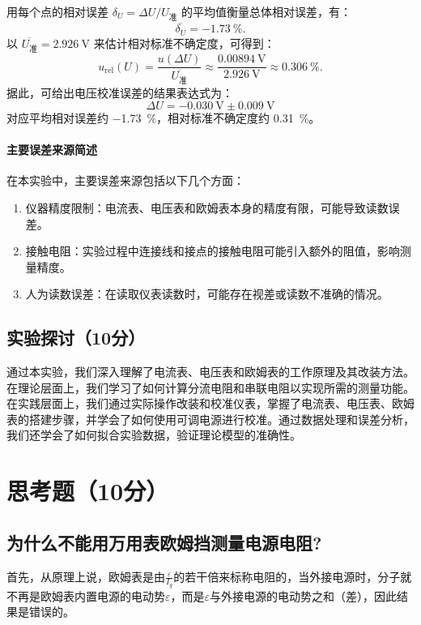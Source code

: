 \documentclass[]{../../templates/Report}%
\begin{document}
\begin{fullreportonly}
    用每个点的相对误差 $\delta_U=\Delta U/U_\text{准}$ 的平均值衡量总体相对误差，有：
    \begin{equation}
        \overline{\delta_U}=\SI{-1.73}{\percent}.
    \end{equation}
    以 $\overline{U_\text{准}}=\SI{2.926}{\volt}$ 来估计相对标准不确定度，可得到：
    \begin{equation}
        u_\text{rel}(U) = \frac{u(\Delta U)}{\overline{U_\text{准}}} \approx \frac{\SI{0.00894}{\volt}}{\SI{2.926}{\volt}} \approx \SI{0.306}{\percent}.
    \end{equation}
    据此，可给出电压校准误差的结果表达式为：
    \begin{equation}
        \boxed{\Delta U = \SI{-0.030}{\volt} \pm \SI{0.009}{\volt}}
    \end{equation}
    对应平均相对误差约 \SI{-1.73}{\percent}，相对标准不确定度约 \SI{0.31}{\percent}。

    \paragraph{主要误差来源简述}
    在本实验中，主要误差来源包括以下几个方面：
    \begin{enumerate}
        \item 仪器精度限制：电流表、电压表和欧姆表本身的精度有限，可能导致读数误差。
        \item 接触电阻：实验过程中连接线和接点的接触电阻可能引入额外的阻值，影响测量精度。
        \item 人为读数误差：在读取仪表读数时，可能存在视差或读数不准确的情况。
    \end{enumerate}

    \subsection{实验探讨（10分）}
    通过本实验，我们深入理解了电流表、电压表和欧姆表的工作原理及其改装方法。在理论层面上，我们学习了如何计算分流电阻和串联电阻以实现所需的测量功能。
    在实践层面上，我们通过实际操作改装和校准仪表，掌握了电流表、电压表、欧姆表的搭建步骤，并学会了如何使用可调电源进行校准。通过数据处理和误差分析，我们还学会了如何拟合实验数据，验证理论模型的准确性。

    \section{思考题（10分）}
    \subsection{为什么不能用万用表欧姆挡测量电源电阻?}
    首先，从原理上说，欧姆表是由$\frac{\varepsilon}{I_g}$的若干倍来标称电阻的，当外接电源时，分子就不再是欧姆表内置电源的电动势$\varepsilon$，而是$\varepsilon$与外接电源的电动势之和（差），因此结果是错误的。


\end{fullreportonly}
\end{document}
